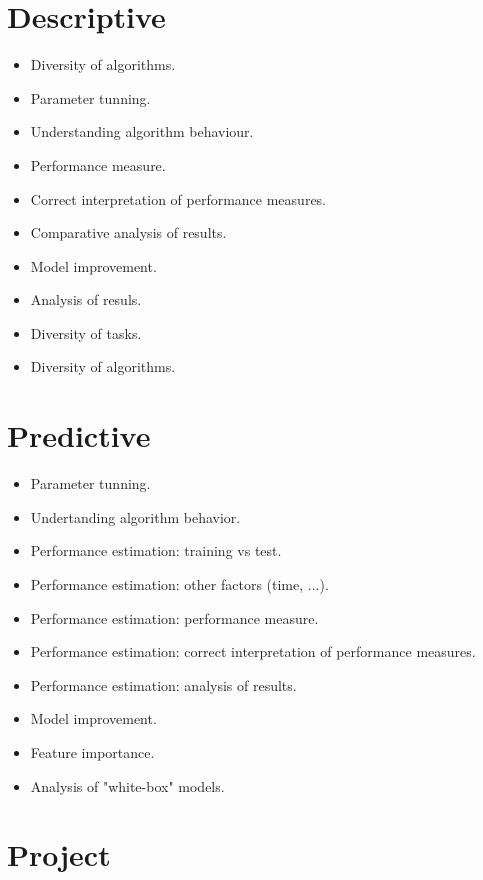 \documentclass[a4paper,12pt]{report}
\begin{document}
\chapter{Descriptive}

\begin{itemize}
    \item Diversity of algorithms.
    \item Parameter tunning.
    \item Understanding algorithm behaviour.
    \item Performance measure.
    \item Correct interpretation of performance measures.
    \item Comparative analysis of results.
    \item Model improvement.
    \item Analysis of resuls.
	\item Diversity of tasks.
	\item Diversity of algorithms.
\end{itemize}


\chapter{Predictive}

\begin{itemize}
    \item Parameter tunning.
	\item Undertanding algorithm behavior.
	\item Performance estimation: training vs test.
	\item Performance estimation: other factors (time, ...).
	\item Performance estimation: performance measure.
	\item Performance estimation: correct interpretation of performance measures.
	\item Performance estimation: analysis of results.
	\item Model improvement.
	\item Feature importance.
	\item Analysis of "white-box" models.
\end{itemize}
	


\chapter{Project}
\end{document}
